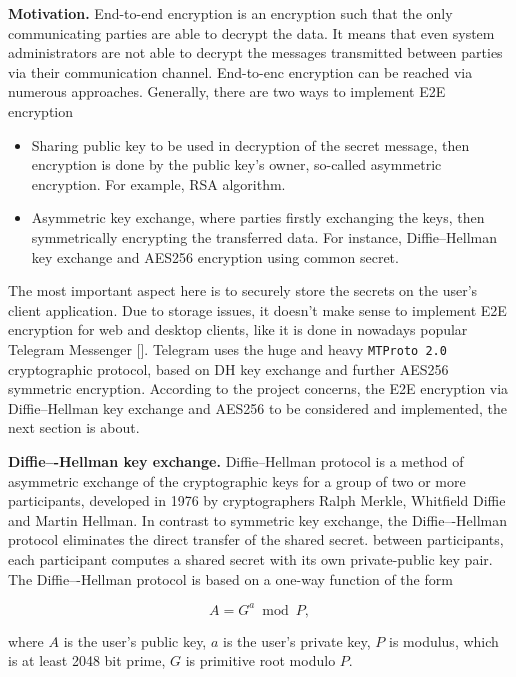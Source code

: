 \textbf{Motivation.} End-to-end encryption is an encryption such that the only communicating parties
are able to decrypt the data.
It means that even system administrators are not able to decrypt the messages transmitted between parties
via their communication channel.
End-to-enc encryption can be reached via numerous approaches.
Generally, there are two ways to implement E2E encryption
\begin{itemize}
    \item Sharing public key to be used in decryption of the secret message, then encryption is done by the
    public key's owner, so-called asymmetric encryption.
    For example, RSA algorithm.
    \item Asymmetric key exchange, where parties firstly exchanging the keys, then symmetrically encrypting
    the transferred data.
    For instance, Diffie--Hellman key exchange and AES256 encryption using common secret.
\end{itemize}
The most important aspect here is to securely store the secrets on the user's client application.
Due to storage issues, it doesn't make sense to implement E2E encryption for web
and desktop clients, like it is done in nowadays popular Telegram Messenger
[\cite{job2015modified,suvsanka2017security,lee2017security}].
Telegram uses the huge and heavy \texttt{MTProto 2.0} cryptographic protocol, based on DH key exchange and further AES256
symmetric encryption.
According to the project concerns, the E2E encryption via Diffie--Hellman key exchange and AES256
to be considered and implemented, the next section is about.

\textbf{Diffie–-Hellman key exchange.} Diffie--Hellman protocol is a method of asymmetric exchange
of the cryptographic keys for a group of two or more participants,
developed in 1976 by cryptographers Ralph Merkle, Whitfield Diffie and Martin Hellman.
In contrast to symmetric key exchange, the Diffie–-Hellman protocol eliminates the direct transfer of the shared secret.
between participants, each participant computes a shared secret with its own private-public key pair.
The Diffie–-Hellman protocol is based on a one-way function of the form

\[
    A = G ^ a \bmod P,
\]

where $A$ is the user's public key, $a$ is the user's private key, $P$ is modulus, which is at least 2048 bit prime,
$G$ is primitive root modulo $P$.

